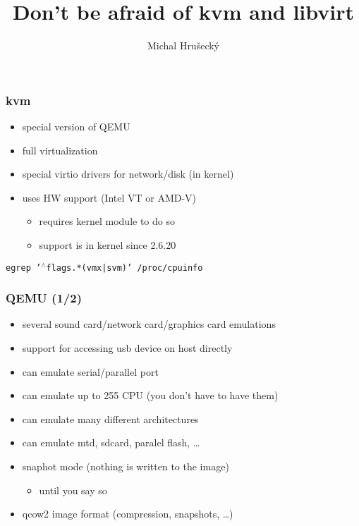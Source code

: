 \documentclass{beamer}
\author{Michal Hru\v{s}eck\'{y}\newline {\small openSUSE Boosters}}
\title{Don't be afraid of kvm and libvirt}
\begin{document}
\begin{frame}[t,plain]
\titlepage
\end{frame}


\begin{frame}[t]
\frametitle{kvm}
\begin{itemize}
   \item special version of QEMU
   \item full virtualization
   \item special virtio drivers for network/disk (in kernel)
   \item uses HW support (Intel VT or AMD-V)
   \begin{itemize}
   	\item requires kernel module to do so
   	\item support is in kernel since 2.6.20
   \end{itemize}
\end{itemize}

\vspace{.2cm}
\begin{center}
\texttt{egrep '$^\wedge$flags.*(vmx|svm)' /proc/cpuinfo}
\end{center}

\end{frame}

\begin{frame}[t]
\frametitle{QEMU (1/2)}
\begin{itemize}
   \item several sound card/network card/graphics card emulations
   \item support for accessing usb device on host directly
   \item can emulate serial/parallel port
   \item can emulate up to 255 CPU (you don't have to have them)
   \item can emulate many different architectures
   \item can emulate mtd, sdcard, paralel flash, \dots
   \item snaphot mode (nothing is written to the image)
   \begin{itemize}
   	\item until you say so
   \end{itemize}
   \item qcow2 image format (compression, snapshots, \dots)
\end{itemize}
\end{frame}
\end{document}

